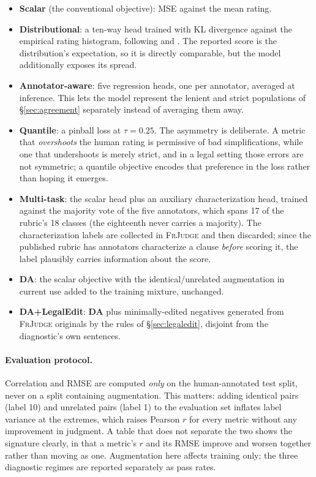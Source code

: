 \documentclass[11pt]{article}
\begin{document}
\begin{itemize}\itemsep2pt
\item \textbf{Scalar} (the conventional objective): MSE against the mean rating.
\item \textbf{Distributional}: a ten-way head trained with KL divergence against
      the empirical rating histogram, following \citet{uma2021learning} and
      \citet{peterson2019human}. The reported score is the distribution's
      expectation, so it is directly comparable, but the model additionally
      exposes its spread.
\item \textbf{Annotator-aware}: five regression heads, one per annotator,
      averaged at inference. This lets the model represent the lenient and
      strict populations of \S\ref{sec:agreement} separately instead of
      averaging them away.
\item \textbf{Quantile}: a pinball loss \citep{koenker1978regression} at
      $\tau=0.25$. The asymmetry is deliberate. A metric that
      \emph{overshoots} the human rating is permissive of bad simplifications,
      while one that undershoots is merely strict, and in a legal setting those
      errors are not symmetric; a quantile objective encodes that preference in
      the loss rather than hoping it emerges.
\item \textbf{Multi-task}: the scalar head plus an auxiliary characterization
      head, trained against the majority vote of the five annotators, which
      spans 17 of the rubric's 18 classes (the eighteenth never carries a
      majority). The characterization labels are collected in \textsc{FrJudge}
      and then discarded; since the published rubric has annotators characterize
      a clause \emph{before} scoring it, the label plausibly carries information
      about the score.
\item \textbf{DA}: the scalar objective with the identical/unrelated
      augmentation in current use added to the training mixture, unchanged.
\item \textbf{DA+LegalEdit}: \textbf{DA} plus minimally-edited negatives
      generated from \textsc{FrJudge} originals by the rules of
      \S\ref{sec:legaledit}, disjoint from the diagnostic's own sentences.
\end{itemize}

\paragraph{Evaluation protocol.} Correlation and RMSE are computed \emph{only}
on the human-annotated test split, never on a split containing augmentation.
This matters: adding identical pairs (label 10) and unrelated pairs (label 1) to
the evaluation set inflates label variance at the extremes, which raises Pearson
$r$ for every metric without any improvement in judgment. A table that does not
separate the two shows the signature clearly, in that a metric's $r$ and its
RMSE improve and worsen together rather than moving as one. Augmentation here
affects training only; the three diagnostic regimes are reported separately as
pass rates.
\end{document}
